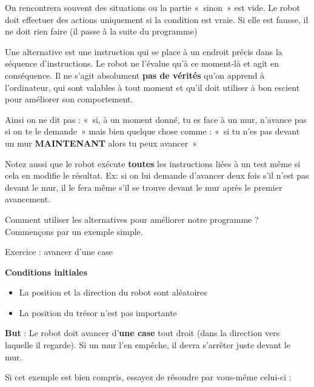 	On rencontrera souvent des situations ou la partie «~sinon~» est vide.
	Le robot doit effectuer des actions uniquement si la condition est
	vraie. Si elle est fausse, il ne doit rien faire (il passe à la suite
	du programme)

	Une alternative est une instruction qui se place à un endroit précis
	dans la séquence d'instructions. Le robot ne
	l'évalue qu'à ce moment-là et agit en
	conséquence. Il ne s'agit absolument \textbf{pas de
	vérités} qu'on apprend à
	l'ordinateur, qui sont valables à tout moment et
	qu'il doit utiliser à bon escient pour améliorer son
	comportement.

	Ainsi on ne dit pas : «~si, à un moment donné, tu es face à un mur,
	n'avance pas si on te le demande~» mais bien quelque
	chose comme : «~si tu n'es pas devant un mur
	\textbf{MAINTENANT} alors tu peux avancer~»

	Notez aussi que le robot exécute \textbf{toutes} les instructions liées
	à un test même si cela en modifie le résultat. Ex: si on lui demande
	d'avancer deux fois s'il
	n'est pas devant le mur, il le fera même
	s'il se trouve devant le mur après le premier
	avancement.

	Comment utiliser les alternatives pour améliorer notre programme ?
	Commençons par un exemple simple.

	\begin{Emphase}{Exercice : avancer d'une case}

		\textbf{Conditions initiales}

		\begin{itemize}
		\item La position et la direction du robot sont aléatoires
		\item La position du trésor n'est pas importante
		\end{itemize}
		
		\textbf{But} : Le robot doit avancer d'\textbf{une
		case} tout droit (dans la direction vers laquelle il regarde). 
		Si un mur l'en empêche, il devra s'arrêter juste devant le mur.

	\end{Emphase}

	
	Si cet exemple est bien compris, 
	essayez de résoudre par vous-même celui-ci :

